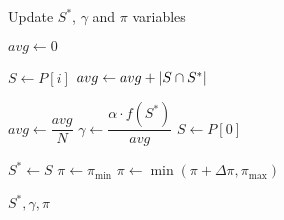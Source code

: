 \begin{algorithm}
  \caption{Update $S^{*}$, $\gamma$ and $\pi$ variables}\label{alg:GENETIKUS-ALGORITMUS:UPDATE}
  \begin{algorithmic}[1]
    \State $avg \leftarrow 0$

    \State $S \leftarrow P\left[ i \right]$
    \State $avg \leftarrow avg + \lvert S \cap S^{*}\rvert$
    \EndFor

    \State $avg \leftarrow \dfrac{avg}{N}$
    \State $\gamma \leftarrow \dfrac{\alpha \cdot f(S^{*})}{avg}$
    \State $S \leftarrow P\left[ 0 \right]$

    \State $S^{*} \leftarrow S$
    \State $\pi \leftarrow \pi_{\min}$
    \Else
    \State $\pi \leftarrow \min(\pi + \Delta \pi, \pi_{\max})$
    \EndIf

    \State \Return $S^{*}, \gamma, \pi$
    \EndFunction
  \end{algorithmic}
\end{algorithm}
